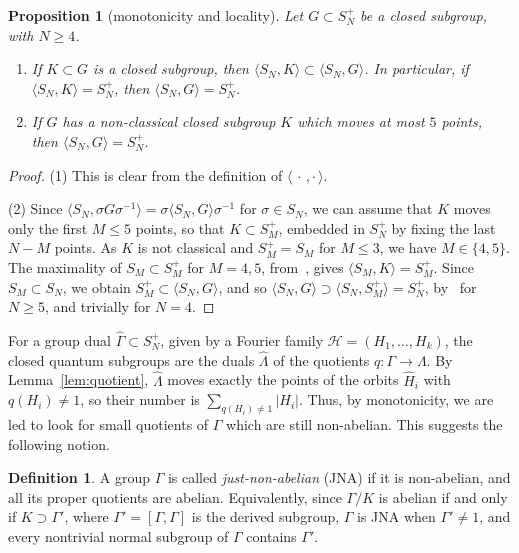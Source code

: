 \documentclass[11pt]{amsart}
\newtheorem{proposition}[theorem]{Proposition}
\theoremstyle{definition}
\newtheorem{definition}[theorem]{Definition}
\theoremstyle{remark}
\theoremstyle{plain}
\numberwithin{equation}{section}
\numberwithin{table}{section}
\begin{document}
\begin{proposition}[monotonicity and locality]\label{prop:monloc}
Let $G\subset S_N^+$ be a closed subgroup, with $N\ge4$.
\begin{enumerate}
\item If $K\subset G$ is a closed subgroup, then $\langle S_N,K\rangle\subset\langle S_N,G\rangle$. In particular, if $\langle S_N,K\rangle=S_N^+$, then $\langle S_N,G\rangle=S_N^+$.
\item If $G$ has a non-classical closed subgroup $K$ which moves at most $5$ points, then $\langle S_N,G\rangle=S_N^+$.
\end{enumerate}
\end{proposition}

\begin{proof}
(1) This is clear from the definition of $\langle\,\cdot\,,\cdot\,\rangle$.

(2) Since $\langle S_N,\sigma G\sigma^{-1}\rangle=\sigma\langle S_N,G\rangle\sigma^{-1}$ for $\sigma\in S_N$, we can assume that $K$ moves only the first $M\le5$ points, so that $K\subset S_M^+$, embedded in $S_N^+$ by fixing the last $N-M$ points. As $K$ is not classical and $S_M^+=S_M$ for $M\le3$, we have $M\in\{4,5\}$. The maximality of $S_M\subset S_M^+$ for $M=4,5$, from~\cite{bah,bb}, gives $\langle S_M,K\rangle=S_M^+$. Since $S_M\subset S_N$, we obtain $S_M^+\subset\langle S_N,G\rangle$, and so $\langle S_N,G\rangle\supset\langle S_N,S_M^+\rangle=S_N^+$, by~\cite[Cor.~3.4]{bcf} for $N\ge5$, and trivially for $N=4$.
\end{proof}

For a group dual $\widehat\Gamma\subset S_N^+$, given by a Fourier family $\mathcal H=(H_1,\dots,H_k)$, the closed quantum subgroups are the duals $\widehat\Lambda$ of the quotients $q:\Gamma\to\Lambda$. By Lemma~\ref{lem:quotient}, $\widehat\Lambda$ moves exactly the points of the orbits $\widehat H_i$ with $q(H_i)\ne1$, so their number is $\sum_{q(H_i)\ne1}|H_i|$. Thus, by monotonicity, we are led to look for small quotients of $\Gamma$ which are still non-abelian. This suggests the following notion.

\begin{definition}
A group $\Gamma$ is called \emph{just-non-abelian} (JNA) if it is non-abelian, and all its proper quotients are abelian. Equivalently, since $\Gamma/K$ is abelian if and only if $K\supset\Gamma'$, where $\Gamma'=[\Gamma,\Gamma]$ is the derived subgroup, $\Gamma$ is JNA when $\Gamma'\ne1$, and every nontrivial normal subgroup of $\Gamma$ contains $\Gamma'$.
\end{definition}
\end{document}
